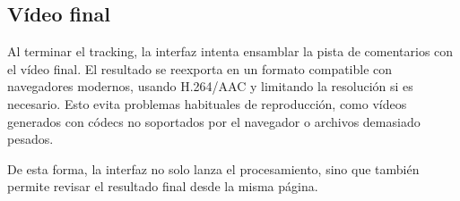 \subsection{Vídeo final}

Al terminar el tracking, la interfaz intenta ensamblar la pista de comentarios con el vídeo final. El resultado se reexporta en un formato compatible con navegadores modernos, usando H.264/AAC y limitando la resolución si es necesario. Esto evita problemas habituales de reproducción, como vídeos generados con códecs no soportados por el navegador o archivos demasiado pesados.

De esta forma, la interfaz no solo lanza el procesamiento, sino que también permite revisar el resultado final desde la misma página.

